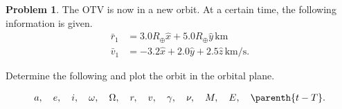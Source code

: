 \documentclass[10pt]{article}
\theoremstyle{definition}
\newtheorem{prob}{Problem}[section]
\begin{document}
\begin{prob}
    The OTV is now in a new orbit.
    At a certain time, the following information is given.
    \begin{align*}
        \bar r_1 &= 3.0 R_\oplus \hat x + 5.0 R_\oplus \hat y \, \si{\kilo\meter}\\
        \bar v_1 &= -3.2 \hat x + 2.0 \hat y + 2.5 \hat z \, \si{\kilo\meter\per\second} .
    \end{align*}

    Determine the following and plot the orbit in the orbital plane.

    \begin{align*}
        a, \quad e, \quad i, \quad \omega, \quad \Omega, \quad r, \quad v, \quad \gamma, \quad \nu, \quad M, \quad E, \quad \parenth{t - T}.
    \end{align*}
\end{prob}
\end{document}

